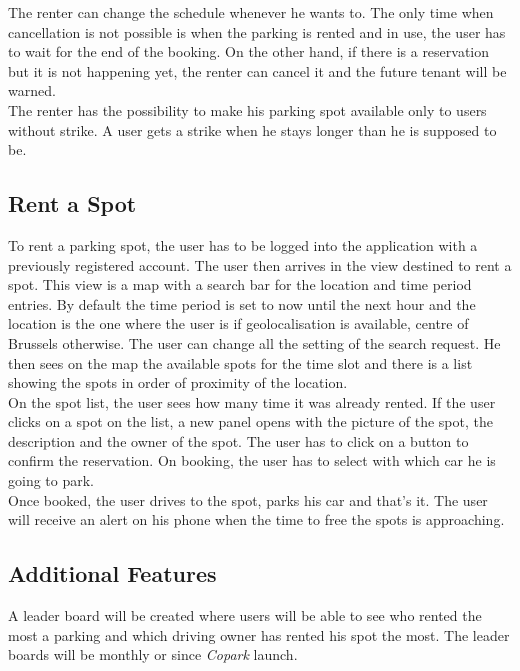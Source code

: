 \documentclass[12pt,a4paper,oneside]{book}
\newcommand{\bp}{\textit{Copark}}
\begin{document}
The renter can change the schedule whenever he wants to. The only time when cancellation is not possible is when the parking is rented and in use, the user has to wait for the end of the booking. On the other hand, if there is a reservation but it is not happening yet, the renter can cancel it and the future tenant will be warned.\\

The renter has the possibility to make his parking spot available only to users without strike. A user gets a strike when he stays longer than he is supposed to be.

\subsection{Rent a Spot}
To rent a parking spot, the user has to be logged into the application with a previously registered account. The user then arrives in the view destined to rent a spot. This view is a map with a search bar for the location and time period entries. By default the time period is set to now until the next hour and the location is the one where the user is if geolocalisation is available, centre of Brussels otherwise. The user can change all the setting of the search request. He then sees on the map the available spots for the time slot and there is a list showing the spots in order of proximity of the location.\\

On the spot list, the user sees how many time it was already rented. If the user clicks on a spot on the list, a new panel opens with the picture of the spot, the description and the owner of the spot. The user has to click on a button to confirm the reservation. On booking, the user has to select with which car he is going to park.\\

Once booked, the user drives to the spot, parks his car and that's it. The user will receive an alert on his phone when the time to free the spots is approaching.

\subsection{Additional Features}
\label{feedes}
A leader board will be created where users will be able to see who rented the most a parking and which driving owner has rented his spot the most. The leader boards will be monthly or since \bp{} launch.\\
\end{document}
